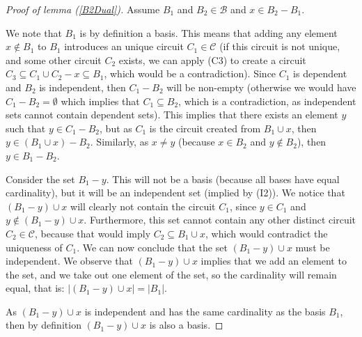 \begin{proof}[Proof of lemma (\ref{B2Dual})]
Assume $B_1$ and $B_2 \in \mathcal{B}$ and $x \in B_2 - B_1$.

    We note that $B_1$ is by definition a basis. This means that adding any element $x \not\in B _1 $ to $B _1 $ introduces an unique circuit $C_1 \in \mathcal{C}$ (if this circuit is not unique, and some other circuit $C _2 $ exists, we can apply (C3) to create a circuit $C _3 \subseteq C _1 \cup C _2 - x \subseteq B_1$, which would be a contradiction). Since $C_1$ is dependent and $B_2$ is independent, then $C_1 - B_2$ will be non-empty (otherwise we would have $C _1 - B _2 = \emptyset$ which implies that $C _1 \subseteq B _2$, which is a contradiction, as independent sets cannot contain dependent sets). This implies that there exists an element $y$ such that $y \in C_1 - B_2$, but as $C_1$ is the circuit created from $B_1 \cup x$, then $y \in (B_1 \cup x) - B_2$. Similarly, as $x \neq y$ (because $x \in B _2 $ and $y \not\in B _2$), then $y \in B_1 - B_2$. 

    Consider the set $B_1 - y$. This will not be a basis (because all bases have equal cardinality), but it will be an independent set (implied by (I2)). We notice that $(B_1 - y)\cup x$ will clearly not contain the circuit $C_1$, since $y \in C _1 $ and $y \not\in (B _1 - y) \cup x$. Furthermore, this set cannot contain any other distinct circuit $C _2 \in \mathcal{C}$, because that would imply $C _2 \subseteq B _1 \cup x$, which would contradict the uniqueness of $C _1 $. We can now conclude that the set $(B_1 - y)\cup x$ must be independent. We observe that $(B_1 - y)\cup x$ implies that we add an element to the set, and we take out one element of the set, so the cardinality will remain equal, that is: $|(B_1 - y)\cup x|=|B_1|$.

As $(B_1 - y)\cup x$ is independent and has the same cardinality as the basis $B_1$, then by definition $(B_1 - y)\cup x$ is also a basis. 
\end{proof}

